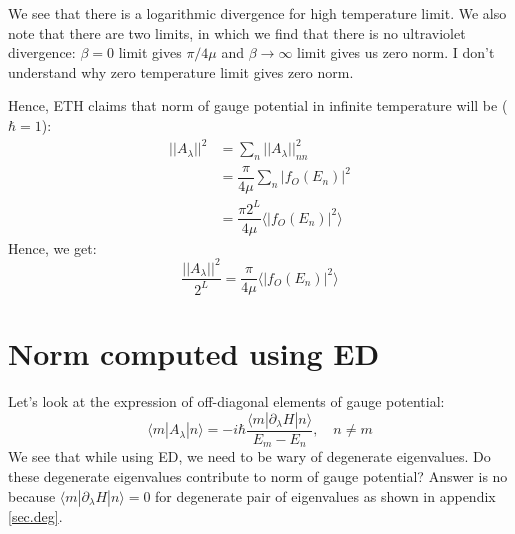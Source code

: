 \documentclass[11pt,a4paper]{article}
\begin{document}
We see that there is a logarithmic divergence for high temperature limit. We also note that there are two limits, in which we find that there is no ultraviolet divergence: $\beta =0$ limit gives $\pi/ 4 \mu$ and $\beta \rightarrow \infty$ limit gives us zero norm. I don't understand why zero temperature limit gives zero norm.


Hence, ETH claims that norm of gauge potential in infinite temperature will be ($\hbar=1$):
\begin{align*}
||A_{\lambda}||^2 &= \sum_n ||A_{\lambda}||^2_{nn} \\
&= \dfrac{\pi}{4 \mu} \sum_n |f_O(E_n)|^2\\
&= \dfrac{\pi 2^L}{4 \mu} \langle |f_O(E_n)|^2  \rangle
\end{align*}
Hence, we get:
\begin{equation}
\boxed{
\dfrac{||A_{\lambda}||^2} {2^L}= \dfrac{\pi }{4 \mu} \langle |f_O(E_n)|^2  \rangle}
\end{equation}

\section{Norm computed using ED}

Let's look at the expression of off-diagonal elements of gauge potential:
\begin{equation}
\langle m |A_{\lambda} | n \rangle =  -i \hbar \dfrac{\langle m |\partial_{\lambda}H | n \rangle}{E_m-E_n}, \quad n \neq m
\end{equation}
We see that while using ED, we need to be wary of degenerate eigenvalues. Do these degenerate eigenvalues contribute to norm of gauge potential? Answer is no because $\langle m |\partial_{\lambda}H | n \rangle=0$ for degenerate pair of eigenvalues as shown in appendix \ref{sec.deg}.



\end{document}
